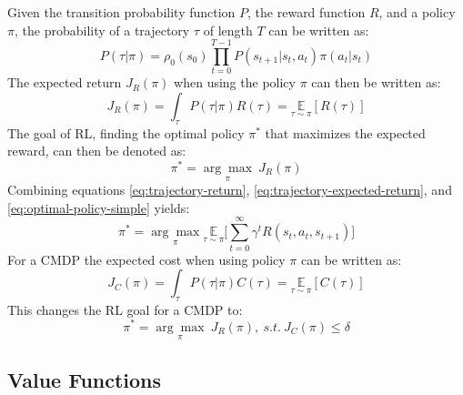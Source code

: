 Given the transition probability function $P$, the reward function $R$, and a policy $\pi$, the probability of a trajectory $\tau$ of length $T$ can be written as:
\begin{equation}
    P(\tau|\pi) = \rho_0(s_0)\prod^{T-1}_{t=0}P(s_{t+1}|s_t,a_t)\pi(a_t|s_t)
\end{equation}
The expected return $J_R(\pi)$ when using the policy $\pi$ can then be written as:
\begin{equation}
    J_R(\pi) = \int_\tau P(\tau|\pi)R(\tau) = \underset{\tau \sim \pi}{\mathbb{E}} [R(\tau)]
    \label{eq:trajectory-expected-return}
\end{equation}
The goal of RL, finding the optimal policy $\pi^*$ that maximizes the expected reward, can then be denoted as:
\begin{equation}
    \pi^* = \underset{\pi}{\arg\max} ~J_R(\pi)
    \label{eq:optimal-policy-simple}
\end{equation}
Combining equations \ref{eq:trajectory-return}, \ref{eq:trajectory-expected-return}, and \ref{eq:optimal-policy-simple} yields:
\begin{equation}
    \pi^* = \underset{\pi}{\arg\max} \underset{\tau\sim\pi}{\mathbb{E}}\Big[\sum^\infty_{t=0}\gamma^t R(s_t,a_t,s_{t+1})\Big]
    \label{eq:optimal-policy}
\end{equation}
For a CMDP the expected cost when using policy $\pi$ can be written as:
\begin{equation}
    J_C(\pi) = \int_\tau P(\tau|\pi)C(\tau) = \underset{\tau \sim \pi}{\mathbb{E}} [C(\tau)]
\end{equation}
This changes the RL goal for a CMDP to:
\begin{equation}
    \pi^* = \underset{\pi}{\arg\max} ~J_R(\pi),~ s.t.~ J_C(\pi) \leq \delta
\end{equation}

\subsection{Value Functions}
\label{sec:preliminaries:rl:valueFunctions}

